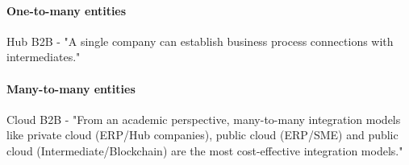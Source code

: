 \paragraph{One-to-many entities} Hub B2B - "A single company can establish business process
connections with intermediates."
\paragraph{Many-to-many entities} Cloud B2B - "From an academic perspective, many-to-many integration models like private cloud (ERP/Hub companies), public cloud (ERP/SME) and public cloud (Intermediate/Blockchain) are the most cost-effective integration models."
